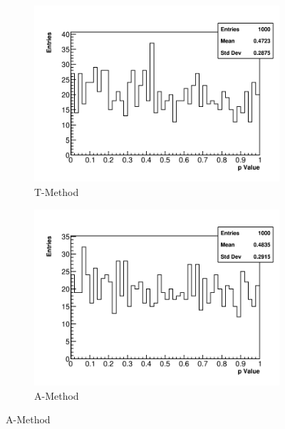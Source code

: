 \begin{figure}
\centering
    \begin{subfigure}[t]{0.45\textwidth}
        \centering
        \includegraphics[width=\textwidth]{PValues_TMethod}
        \caption{T-Method}
    \end{subfigure}
    \hspace{1mm}
    \begin{subfigure}[t]{0.45\textwidth}
        \centering
        \includegraphics[width=\textwidth]{PValues_AMethod}
        \caption{A-Method}
    \end{subfigure}%


\end{figure}

